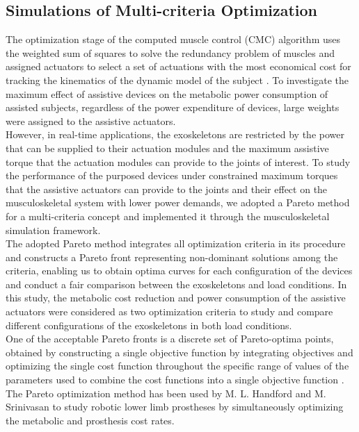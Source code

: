 \documentclass[10pt,letterpaper]{article}
\begin{document}
\subsection*{Simulations of Multi-criteria Optimization}
The optimization stage of the computed muscle control (CMC) algorithm uses the weighted sum of squares to solve the redundancy problem of muscles and assigned actuators to select a set of actuations with the most economical cost for tracking the kinematics of the dynamic model of the subject \cite{92}. To investigate the maximum effect of assistive devices on the metabolic power consumption of assisted subjects, regardless of the power expenditure of devices, large weights were assigned to the assistive actuators.\\
However, in real-time applications, the exoskeletons are restricted by the power that can be supplied to their actuation modules and the maximum assistive torque that the actuation modules can provide to the joints of interest. To study the performance of the purposed devices under constrained maximum torques that the assistive actuators can provide to the joints and their effect on the musculoskeletal system with lower power demands, we adopted a Pareto method for a multi-criteria concept\cite{113} and implemented it through the musculoskeletal simulation framework.\\
The adopted Pareto method integrates all optimization criteria in its procedure and constructs a Pareto front representing non-dominant solutions among the criteria, enabling us to obtain optima curves for each configuration of the devices \cite{107} and conduct a fair comparison between the exoskeletons and load conditions. In this study, the metabolic cost reduction and power consumption of the assistive actuators were considered as two optimization criteria to study and compare different configurations of the exoskeletons in both load conditions.\\
One of the acceptable Pareto fronts is a discrete set of Pareto-optima points, obtained by constructing a single objective function by integrating objectives and optimizing the single cost function throughout the specific range of values of the parameters used to combine the cost functions into a single objective function \cite{108}.\\
The Pareto optimization method has been used by M. L. Handford and M. Srinivasan\cite{111,127} to study robotic lower limb prostheses by simultaneously optimizing the metabolic and prosthesis cost rates. \\
\end{document}
